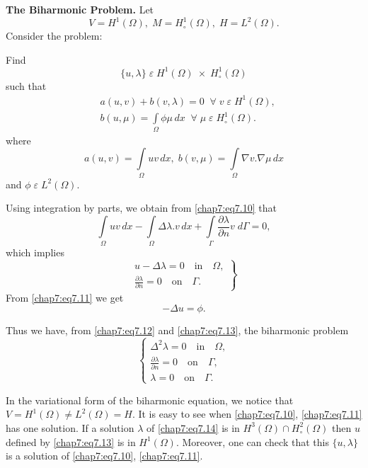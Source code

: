 \begin{exam}\label{chap7:exm2}
{\bf The Biharmonic Problem.} Let 
$$
V=H^1(\Omega),\;M=H_\circ^1(\Omega),\;H=L^2(\Omega).
$$
Consider the problem:

Find
$$
\{u,\lambda\}\;\varepsilon\;H^1(\Omega)\;\times\;H_\circ^1(\Omega)
$$
such that 
\begin{align}
& a(u,v)+b(v,\lambda)=0\; \; \forall\;v\;\varepsilon\;H^1(\Omega),\label{chap7:eq7.10}\\
& b(u,\mu)=\int\limits_\Omega\phi\mu\,dx\; \; \forall\;\mu\;\varepsilon\;
H_\circ^1(\Omega).\label{chap7:eq7.11}
\end{align}
where
$$
a(u,v)=\int\limits_\Omega uv\,dx,\;b(v,\mu)=\int\limits_\Omega\nabla
v.\nabla\mu\,dx 
$$
and $\phi\;\varepsilon\;L^2(\Omega)$.

Using integration by parts, we obtain from \eqref{chap7:eq7.10} that 
$$
\int\limits_\Omega uv\,dx-\int\limits_\Omega\Delta\lambda.v\,dx+
\int\limits_\Gamma\frac{\partial\lambda}{\partial n}v\;d\Gamma=0,
$$
which implies 
\begin{equation}\label{chap7:eq7.12}
\left.
\begin{aligned}
u-\Delta\lambda =0\quad\text{in}\quad\Omega,\\
\frac{\partial\lambda}{\partial n}=0\quad\text{on}\quad\Gamma.
\end{aligned}
\right\}
\end{equation}\pageoriginale
From \eqref{chap7:eq7.11} we get
\begin{equation}\label{chap7:eq7.13}
-\Delta u=\phi.
\end{equation}

Thus we have, from \eqref{chap7:eq7.12} and \eqref{chap7:eq7.13}, the
biharmonic problem 
\begin{equation}\label{chap7:eq7.14}
\begin{cases}
\Delta^2\lambda = 0\quad\text{in}\quad\Omega,\\
\frac{\partial\lambda}{\partial n} = 0\quad\text{on}\quad\Gamma,\\
\lambda = 0\quad\text{on}\quad\Gamma.
\end{cases}
\end{equation}

In the variational form of the biharmonic equation, we notice that
$V=H^1(\Omega)\neq L^2(\Omega)=H$. It is easy to see when
\eqref{chap7:eq7.10}, \eqref{chap7:eq7.11} has one solution. If a
solution $\lambda$ of \eqref{chap7:eq7.14} is in $H^3(\Omega)\cap
H_\circ^2(\Omega)$ then $u$ defined by \eqref{chap7:eq7.13} is in
$H^1(\Omega)$. Moreover, one can check that this $\{u,\lambda\}$ is a
solution of \eqref{chap7:eq7.10}, \eqref{chap7:eq7.11}. 
\end{exam}

